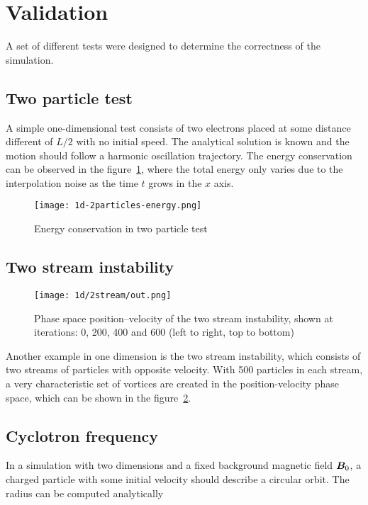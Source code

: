 \section{Validation}

A set of different tests were designed to determine the correctness of the
simulation.

\subsection{Two particle test}

A simple one-dimensional test consists of two electrons placed at some distance 
different of $L/2$ with no initial speed. The analytical solution is known and 
the motion should follow a harmonic oscillation trajectory. The energy 
conservation can be observed in the figure~\ref{fig:1d-2particles-energy}, where 
the total energy only varies due to the interpolation noise as the time $t$ 
grows in the $x$ axis.
%
\begin{figure}[h]
	\centering
	\texttt{[image: 1d-2particles-energy.png]}
	\caption{Energy conservation in two particle test}
	\label{fig:1d-2particles-energy}
\end{figure}

\subsection{Two stream instability}

%
\begin{figure}[ht]
	\centering
	\texttt{[image: 1d/2stream/out.png]}
	\caption{Phase space position--velocity of the two stream instability, shown 
	at iterations: 0, 200, 400 and 600 (left to right, top to bottom)}
	\label{fig:1d-2stream}
\end{figure}

Another example in one dimension is the two stream instability, which consists 
of two streams of particles with opposite velocity. With 500 particles in each 
stream, a very characteristic set of vortices are created in the 
position-velocity phase space, which can be shown in the 
figure~\ref{fig:1d-2stream}.

\subsection{Cyclotron frequency}

In a simulation with two dimensions and a fixed background magnetic field 
$\bm{B}_0$, a charged particle with some initial velocity should describe a circular 
orbit. The radius can be computed analytically
